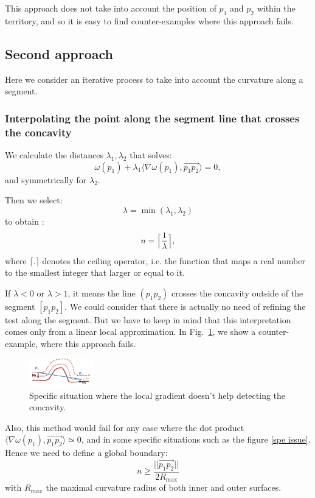 \documentclass[11pt,a4paper]{article}
\newcommand{\scal}[2]{\ensuremath{\langle #1 , #2 \rangle}}
\begin{document}
This approach does not take into account the position of $p_1$ and $p_2$ within the territory, and so it is easy to find counter-examples where this approach fails.

\subsection{Second approach}

Here we consider an iterative process to take into account the curvature along a segment.

\subsubsection{Interpolating the point along the segment line that crosses the concavity} \label{subsec}
We calculate the distances $\lambda_1,\lambda_2$ that solves:
\begin{equation}
\omega (p_1) + \lambda_1 \scal{\nabla\omega(p_1)}{\overset{\rightarrow}{p_1p_2}} =  0,
\end{equation}
and symmetrically for $\lambda_2$.


Then we select:
\begin{equation}
\lambda = \min(\lambda_1, \lambda_2)
\end{equation}
to obtain :
\begin{equation}
n = \Bigl\lceil \frac{1}{\lambda} \Bigr\rceil,
\end{equation}
where $\lceil.\rceil$ denotes the ceiling operator, i.e. the function that maps a real number to the smallest integer that larger or equal to it.

If  $\lambda < 0$ or $\lambda > 1$, it means the line $(p_1p_2)$ crosses the concavity outside of the segment $[p_1p_2]$. We could consider that there is actually no need of refining the test along the segment. But we have to keep in mind that this interpretation comes only from a linear local approximation. In Fig.~\ref{fig:cec}, we show a counter-example, where this approach fails.

\begin{figure}[h!]
			\label{spe issue}
			\centering
			\includegraphics[width=0.25\textwidth]{Drawings/CurvatureTestExample1.png}
			\caption{Specific situation where the local gradient doesn't help detecting the concavity.\label{fig:cec}}
\end{figure}
Also, this method would fail for any case where the dot product $\scal{\nabla \omega(p_1)}{\overset{\rightarrow}{p_1p_2}} \simeq 0$, and in some specific situations such as the figure \ref{spe issue}. Hence we need to define a global boundary:
\begin{equation}
n \geq \frac{||\overset{\rightarrow}{p_1p_2}||}{2R_{\text{max}}}
\end{equation}
with $R_{max}$ the maximal curvature radius of both inner and outer surfaces.
\end{document}
